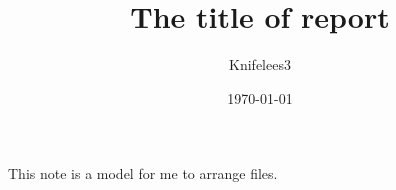 \documentclass[mathserif]{beamer}
\begin{document}
\title{The title of report}
\author{Knifelees3}
\date{\today}
\frame{\titlepage}

\begin{frame}
This note is a model for me to arrange files.

\end{frame}
\end{document}
